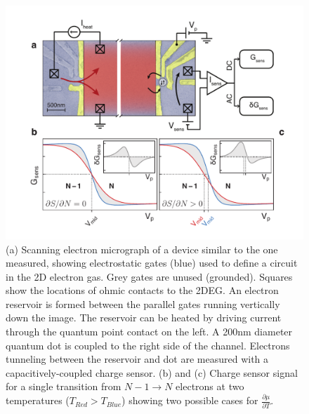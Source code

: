 \documentclass[twocolumn,showpacs,amsmath,amssymb,prl,aps,superscriptaddress]{revtex4-1}
\begin{document}
\begin{figure}[!]
        \includegraphics[width=1.0\columnwidth]{../figures/figure_1_annotated.pdf}
        \caption{\label{fig:fig1}(a) Scanning electron micrograph of a device similar to the one measured, showing electrostatic gates (blue) used to define a circuit in the 2D electron gas. Grey gates are unused (grounded). Squares show the locations of ohmic contacts to the 2DEG. An electron reservoir is formed between the parallel gates running vertically down the image. The reservoir can be heated by driving current through the quantum point contact on the left. A 200nm diameter quantum dot is coupled to the right side of the channel. Electrons tunneling between the reservoir and dot are measured with a capacitively-coupled charge sensor. (b) and (c) Charge sensor signal for a single transition from $N-1 \rightarrow N$ electrons at two temperatures ($T_{Red} > T_{Blue}$) showing two possible cases for $\frac{\partial \mu}{\partial T}$.}
\end{figure}

\end{document}
